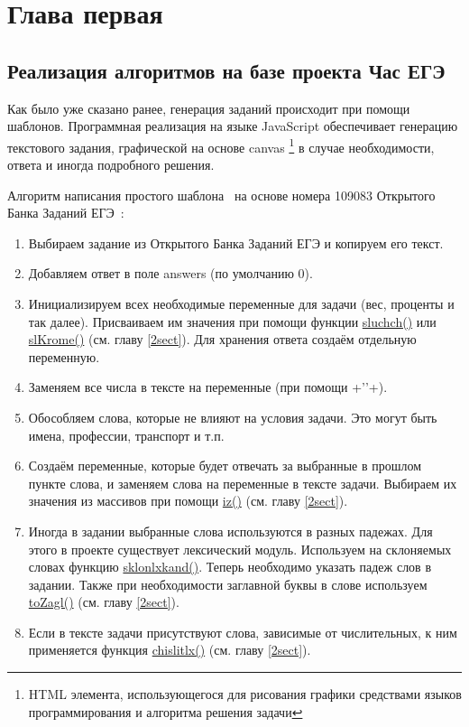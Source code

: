 
\section{Глава первая}
\subsection{Реализация алгоритмов на базе проекта Час ЕГЭ}
Как было уже сказано ранее, генерация заданий происходит при помощи шаблонов.
Программная реализация на языке JavaScript обеспечивает генерацию текстового задания,
графической на основе canvas
\footnote{HTML элемента, использующегося для рисования графики средствами языков программирования и алгоритма решения задачи} в случае необходимости,
ответа и иногда подробного решения.

Алгоритм написания простого шаблона~\cite{chasi} на основе номера 109083 Открытого Банка Заданий ЕГЭ~\cite{fipi}:
\begin{enumerate}
	\item Выбираем задание из Открытого Банка Заданий ЕГЭ и копируем его текст.
	\item Добавляем ответ в поле answers (по умолчанию 0).
	      
	\item Инициализируем всех необходимые переменные для задачи (вес, проценты и так далее).
	      Присваиваем им значения при помощи функции \hyperlink{sluchch}{sluchch()} или
	      \hyperlink{slKrome}{slKrome()} (см. главу \ref{2sect}). Для хранения ответа создаём отдельную переменную.
	      
	\item Заменяем все числа в тексте на переменные (при помощи +'\cdot'+).
	\item Обособляем слова, которые не влияют на условия задачи. Это могут быть
	      имена, профессии, транспорт и т.п.
	\item Создаём переменные, которые будет отвечать за выбранные в прошлом пункте
	      слова, и заменяем слова на переменные в тексте задачи.
	      Выбираем их значения из массивов при помощи \hyperlink{iz}{iz()} (см. главу \ref{2sect}).
	\item Иногда в задании выбранные слова используются в разных падежах.
	      Для этого в проекте существует лексический модуль.
	      Используем на склоняемых словах функцию \hyperlink{sklonlxkand}{sklonlxkand()}.
	      Теперь необходимо указать падеж слов в задании.
	      Также при необходимости заглавной буквы в слове используем
	      \hyperlink{toZagl}{toZagl()} (см. главу \ref{2sect}).
	\item Если в тексте задачи присутствуют слова, зависимые от числительных,
	      к ним применяется функция \hyperlink{chislitlx}{chislitlx()} (см. главу \ref{2sect}).
	      
\end{enumerate}

